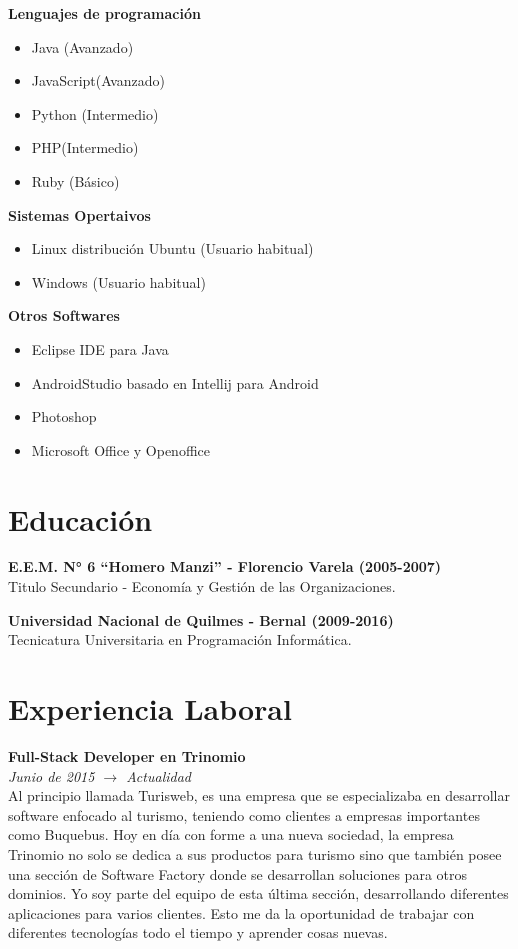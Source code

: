 \documentclass[margin, line, a4paper]{resume}
\begin{document}
\begin{resume}
\begin{multicols}{2}
        \textbf{Lenguajes de programación}
          \begin{itemize}
            \item Java (Avanzado)
            \item JavaScript(Avanzado)
            \item Python (Intermedio)
            \item PHP(Intermedio)
            \item Ruby (Básico) 
          \end{itemize}

        \textbf{Sistemas Opertaivos}
          \begin{itemize}
            \item Linux distribución Ubuntu (Usuario habitual)
            \item Windows (Usuario habitual)
          \end{itemize}
        \textbf{Otros Softwares}
          \begin{itemize}
            \item Eclipse IDE para Java
            \item AndroidStudio basado en Intellij para Android
            \item Photoshop
            \item Microsoft Office y Openoffice
          \end{itemize}
      \end{multicols}

    \section{\mysidestyle Educación}
      \textbf{E.E.M. N° 6 ``Homero Manzi''  - Florencio Varela (2005-2007)} \\
      Titulo Secundario - Economía y Gestión de las Organizaciones.

      \textbf{Universidad Nacional de Quilmes - Bernal (2009-2016)} \\
      Tecnicatura Universitaria en Programación Informática.

    \section{\mysidestyle Experiencia Laboral}\vspace{1mm}
      \textbf{Full-Stack Developer en Trinomio} \\
      \textit{Junio de 2015 $\rightarrow$ Actualidad} \\
      Al principio llamada Turisweb, es una empresa que se especializaba en desarrollar software enfocado al turismo, teniendo como clientes a empresas importantes como Buquebus. Hoy en día con forme a una nueva sociedad, la empresa Trinomio no solo se dedica a sus productos para turismo sino que también posee una sección de Software Factory donde se desarrollan soluciones para otros dominios. Yo soy parte del equipo de esta última sección, desarrollando diferentes aplicaciones para varios clientes. Esto me da la oportunidad de trabajar con diferentes tecnologías todo el tiempo y aprender cosas nuevas.


\end{resume}
\end{document}

